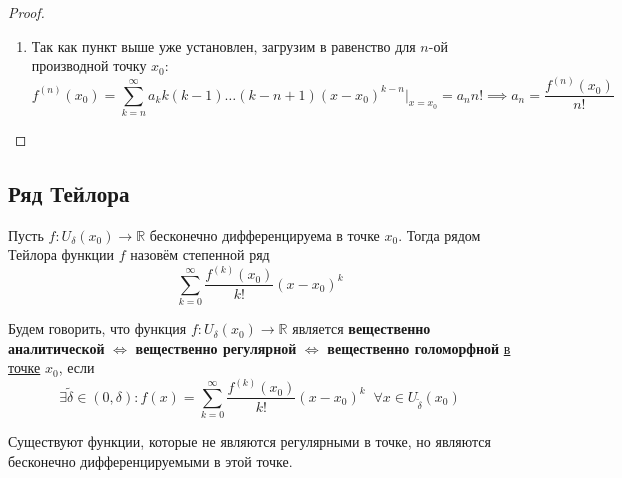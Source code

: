 \documentclass[11pt]{article}
\begin{document}
\begin{proof}
\begin{enumerate}
        Но $\underline{x} \in \left(x_0 - R_{\text{сх}}, x_0 + R_{\text{сх}}\right)$ было выбрано произвольно, а значит требуемое доказано для однократного взятия производной. Тогда, положив проверенное базой индукции и рассуждая по индукции далее (берём $f^{(n)}$ вместо $f$, и $f^{(n + 1)}$ вместо $f'$), получаем, что 
        \[\forall n \in \mathbb{N} \; \; \forall \underline{x} \in \left(x_0 - R_{\text{сх}}, x_0 + R_{\text{сх}}\right) \hookrightarrow \exists f^{(n)} (\underline{x}) = \sum_{k = n}^{\infty} a_k k (k - 1) \ldots (k - n + 1) (\underline{x} - x_0)^{k - n}\]
        Таким образом, второй пункт и утверждение $f \in C^{\infty} (\left(x_0 - R_{\text{сх}}, x_0 + R_{\text{сх}}\right))$ полностью доказаны.
        \item Так как пункт выше уже установлен, загрузим в равенство для $n$-ой производной точку $x_0$:
        \[f^{(n)} (x_0) = \sum_{k = n}^{\infty} a_k k (k - 1) \ldots (k - n + 1) (x - x_0)^{k - n} \Biggr|_{x = x_0} = a_n n! \implies a_n = \frac{f^{(n)} (x_0)}{n!}\]
    \end{enumerate}
\end{proof}

\subsection{Ряд Тейлора}

\begin{definition}
    Пусть $f \colon U_{\delta} (x_0) \to \mathbb{R}$ бесконечно дифференцируема в точке $x_0$. Тогда рядом Тейлора функции $f$ назовём степенной ряд 
    \[\sum_{k = 0}^{\infty} \frac{f^{(k)}(x_0)}{k!} (x - x_0)^k\]
\end{definition}

\begin{definition}
    Будем говорить, что функция $f \colon U_{\delta} (x_0) \to \mathbb{R}$ является \textbf{вещественно аналитической} $\iff$ \textbf{вещественно регулярной} $\iff$ \textbf{вещественно голоморфной} \underline{в точке} $x_0$, если 
    \[\exists \widetilde{\delta} \in (0, \delta): f(x) = \sum_{k = 0}^{\infty} \frac{f^{(k)}(x_0)}{k!} (x - x_0)^k \; \; \forall x \in U_{\widetilde{\delta}}(x_0)\]
\end{definition}

\begin{remark}
    Существуют функции, которые не являются регулярными в точке, но являются бесконечно дифференцируемыми в этой точке.
\end{remark}
\end{document}
